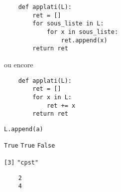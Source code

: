 \ques 

\begin{verbatim}
    def applati(L):
        ret = []
        for sous_liste in L:
            for x in sous_liste:
                ret.append(x)
        return ret
\end{verbatim}
ou encore 

\begin{verbatim}
    def applati(L):
        ret = []
        for x in L:
            ret += x
        return ret
\end{verbatim}

\ques \texttt{L.append(a)}

\quessques \texttt{True}
\ssques \texttt{True}
\ssques \texttt{False}

\quessques \texttt{[3]}
\ssques \texttt{"cpst"}
\ssques \begin{verbatim}
    2
    4
\end{verbatim}
